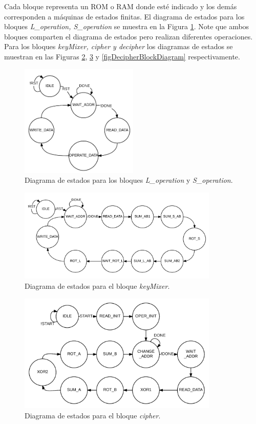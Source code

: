 Cada bloque representa un ROM o RAM donde esté indicado y los demás corresponden a máquinas de estados finitas. El diagrama de estados para los bloques \textit{L\_operation, S\_operation} se muestra en la Figura \ref{figSL_operationFSM}. Note que ambos bloques comparten el diagrama de estados pero realizan diferentes operaciones. Para los bloques \textit{keyMixer, cipher y decipher} los diagramas de estados se muestran en las Figuras \ref{figKeyMixerFSM}, \ref{figCipherFSM} y \ref{figDecipherBlockDiagram} respectivamente.

\begin{figure}
	\centering
	\includegraphics[width=0.5\textwidth]{./images/figSL_operationFSM}
	\caption{Diagrama de estados para los bloques \textit{L\_operation} y \textit{S\_operation}.}
	\label{figSL_operationFSM}
\end{figure}
\begin{figure}
	\centering
	\includegraphics[width=0.85\textwidth]{./images/figKeyMixerFSM}
	\caption{Diagrama de estados para el bloque \textit{keyMixer}.}
	\label{figKeyMixerFSM}
\end{figure}
\begin{figure}
	\centering
	\includegraphics[width=0.85\textwidth]{./images/figCipherFSM}
	\caption{Diagrama de estados para el bloque \textit{cipher}.}
	\label{figCipherFSM}
\end{figure}
